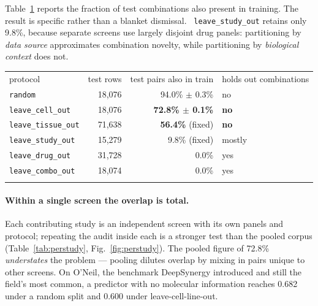 \documentclass{ws-procs11x85}
\begin{document}
Table~\ref{tab:overlap} reports the fraction of test combinations also present in
training. The result is specific rather than a blanket dismissal. {\tt
leave\_study\_out} retains only 9.8\%, because separate screens use largely
disjoint drug panels: partitioning by \emph{data source} approximates combination
novelty, while partitioning by \emph{biological context} does not.

\begin{table}[ht]
{\begin{tabular}{@{}lrrl@{}} \toprule
protocol & test rows & test pairs also in train & holds out combinations \\ \colrule
{\tt random} & 18,076 & 94.0\% $\pm$ 0.3\% & no \\
{\tt leave\_cell\_out} & 18,076 & \textbf{72.8\% $\pm$ 0.1\%} & \textbf{no} \\
{\tt leave\_tissue\_out} & 71,638 & \textbf{56.4\%} (fixed) & \textbf{no} \\
{\tt leave\_study\_out} & 15,279 & 9.8\% (fixed) & mostly \\
{\tt leave\_drug\_out} & 31,728 & 0.0\% & yes \\
{\tt leave\_combo\_out} & 18,074 & 0.0\% & yes \\ \botrule
\end{tabular}}
\label{tab:overlap}
\end{table}

\paragraph{Within a single screen the overlap is total.} Each contributing study
is an independent screen with its own panels and protocol; repeating the audit
inside each is a stronger test than the pooled corpus (Table~\ref{tab:perstudy},
Fig.~\ref{fig:perstudy}). The pooled figure of 72.8\% \emph{understates} the
problem --- pooling dilutes overlap by mixing in pairs unique to other screens.
On O'Neil, the benchmark DeepSynergy introduced and still the field's most
common, a predictor with no molecular information reaches 0.682 under a random
split and 0.600 under leave-cell-line-out.
\end{document}

